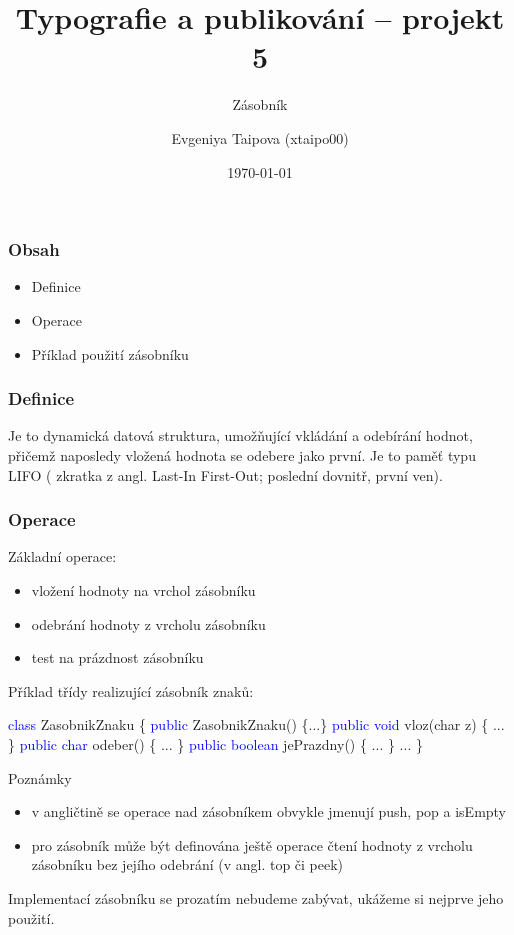 \documentclass{beamer}
\title{Typografie a publikování -- projekt 5}
\subtitle{Zásobník}
\author{Evgeniya Taipova (xtaipo00)}
\date{\today}
\institute
{
	Vysoké učení technické v~Brně\\
	Fakulta informačních technologií
}
\begin{document}
  \frame{\titlepage}

  \begin{frame}
    \frametitle{Obsah}
    
    \begin{itemize}
      \item Definice
      \item Operace
      \item Příklad použití zásobníku
    \end{itemize}
  \end{frame}

  \begin{frame}
    \frametitle{Definice}
   Je to dynamická datová struktura, umožňující vkládání a odebírání hodnot, přičemž
naposledy vložená hodnota se odebere jako první.
Je to paměť typu LIFO ( zkratka z angl. Last-In First-Out; poslední dovnitř, první ven).
\newline
\begin{center}
\end{center}
  \end{frame}
  
  \begin{frame}
    \frametitle{Operace}
   Základní operace:
   \begin{itemize}
       \item vložení hodnoty na vrchol zásobníku
       \item odebrání hodnoty z vrcholu zásobníku
       \item test na prázdnost zásobníku
   \end{itemize}
  \end{frame}
 
  \begin{frame}
   Příklad třídy realizující zásobník znaků:
   \begin{center}
      \textcolor{blue}{class} ZasobnikZnaku \{ \newline
\textcolor{blue}{public} ZasobnikZnaku() \{...\}\newline
\textcolor{blue}{public void} vloz(char z) \{ ... \}\newline
\textcolor{blue}{public char} odeber() \{ ... \}\newline
\textcolor{blue}{public boolean} jePrazdny() \{ ... \}\newline
...\newline
\} 
   \end{center}
 Poznámky
\begin{itemize}
\item v angličtině se operace nad zásobníkem obvykle jmenují push, pop a isEmpty
\item pro zásobník může být definována ještě operace čtení hodnoty z vrcholu
zásobníku bez jejího odebrání (v angl. top či peek)
\end{itemize}
 Implementací zásobníku se prozatím nebudeme zabývat, ukážeme si nejprve jeho
použití.
  \end{frame}
\end{document}
